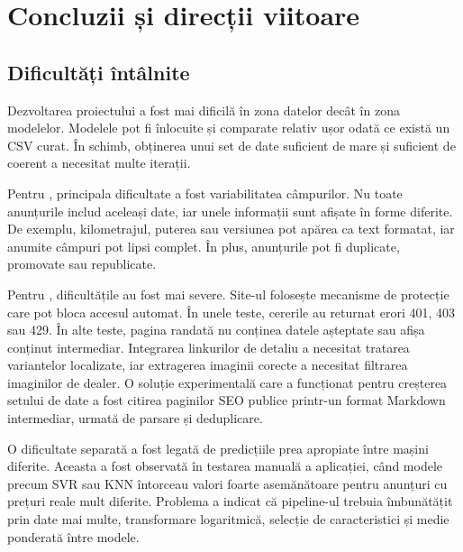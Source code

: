 \chapter{Concluzii și direcții viitoare}
\label{chapter:conclusions}

\section{Dificultăți întâlnite}
\label{sec:conclusions-difficulties}

Dezvoltarea proiectului a fost mai dificilă în zona datelor decât în zona modelelor. Modelele pot fi înlocuite și comparate relativ ușor odată ce există un CSV curat. În schimb, obținerea unui set de date suficient de mare și suficient de coerent a necesitat multe iterații.

Pentru \autovit, principala dificultate a fost variabilitatea câmpurilor. Nu toate anunțurile includ aceleași date, iar unele informații sunt afișate în forme diferite. De exemplu, kilometrajul, puterea sau versiunea pot apărea ca text formatat, iar anumite câmpuri pot lipsi complet. În plus, anunțurile pot fi duplicate, promovate sau republicate.

Pentru \mobilede, dificultățile au fost mai severe. Site-ul folosește mecanisme de protecție care pot bloca accesul automat. În unele teste, cererile au returnat erori 401, 403 sau 429. În alte teste, pagina randată nu conținea datele așteptate sau afișa conținut intermediar. Integrarea linkurilor de detaliu a necesitat tratarea variantelor localizate, iar extragerea imaginii corecte a necesitat filtrarea imaginilor de dealer. O soluție experimentală care a funcționat pentru creșterea setului de date a fost citirea paginilor SEO publice printr-un format Markdown intermediar, urmată de parsare și deduplicare.

O dificultate separată a fost legată de predicțiile prea apropiate între mașini diferite. Aceasta a fost observată în testarea manuală a aplicației, când modele precum SVR sau KNN întorceau valori foarte asemănătoare pentru anunțuri cu prețuri reale mult diferite. Problema a indicat că pipeline-ul trebuia îmbunătățit prin date mai multe, transformare logaritmică, selecție de caracteristici și medie ponderată între modele.

